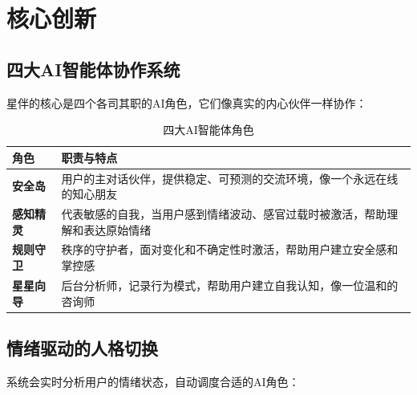 \documentclass[12pt,a4paper]{article}
\begin{document}
\section{核心创新}

\subsection{四大AI智能体协作系统}

星伴的核心是四个各司其职的AI角色，它们像真实的内心伙伴一样协作：

\begin{table}[H]
\centering
\begin{tabular}{>{\bfseries}l p{8cm}}
\toprule
\textbf{角色} & \textbf{职责与特点} \\
\midrule
\textcolor{accentpurple}{安全岛} & 用户的主对话伙伴，提供稳定、可预测的交流环境，像一个永远在线的知心朋友 \\
\addlinespace
\textcolor{warmorange}{感知精灵} & 代表敏感的自我，当用户感到情绪波动、感官过载时被激活，帮助理解和表达原始情绪 \\
\addlinespace
\textcolor{calmblue}{规则守卫} & 秩序的守护者，面对变化和不确定性时激活，帮助用户建立安全感和掌控感 \\
\addlinespace
\textcolor{primaryblue}{星星向导} & 后台分析师，记录行为模式，帮助用户建立自我认知，像一位温和的咨询师 \\
\bottomrule
\end{tabular}
\caption{四大AI智能体角色}
\end{table}

\subsection{情绪驱动的人格切换}

系统会实时分析用户的情绪状态，自动调度合适的AI角色：
\end{document}
